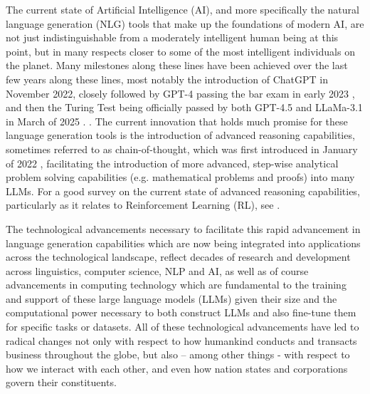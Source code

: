 \documentclass[final]{clv2025}
\begin{document}
The current state of Artificial Intelligence (AI), and more specifically the natural language generation (NLG) tools that make up the foundations of modern AI, are not just indistinguishable from a moderately intelligent human being at this point, but in many respects closer to some of the most intelligent individuals on the planet. Many milestones along these lines have been achieved over the last few years along these lines, most notably the introduction of ChatGPT in November 2022, closely followed by GPT-4 passing the bar exam in early 2023 \cite{articlekatz}, and then the Turing Test being officially passed by both GPT-4.5 and LLaMa-3.1 in March of 2025 \cite{articlejones}. . The current innovation that holds much promise for these language generation tools is the introduction of advanced reasoning capabilities, sometimes referred to as chain-of-thought, which was first introduced in January of 2022 \cite{articlewei}, facilitating the introduction of more advanced, step-wise analytical  problem solving capabilities (e.g. mathematical problems and proofs) into many LLMs. For a good survey on the current state of advanced reasoning capabilities, particularly as it relates to Reinforcement Learning (RL), see \cite{xu2025towards}.

The technological advancements necessary to facilitate this rapid advancement in language generation capabilities which are now being integrated into applications across the technological landscape, reflect decades of research and development across linguistics, computer science, NLP and AI, as well as of course advancements in computing technology which are fundamental to the training and support of these large language models (LLMs) given their size and the computational power necessary to both construct LLMs and also fine-tune them for specific tasks or datasets. All of these technological advancements have led to radical changes not only with respect to how humankind conducts and transacts business throughout the globe, but also – among other things - with respect to how we interact with each other, and even how nation states and corporations govern their constituents. 
\end{document}
